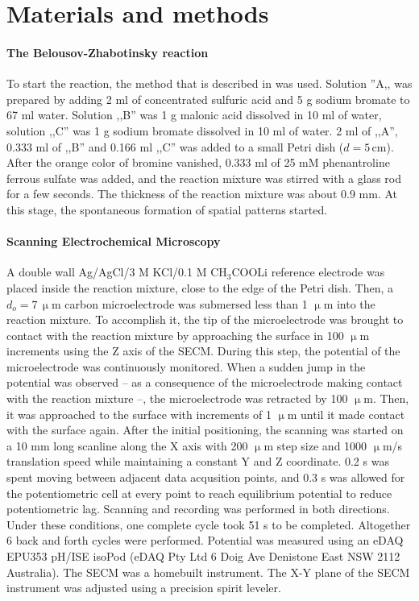\documentclass[3p, twocolumn]{elsarticle}
\begin{document}
\section{Materials and methods}
\paragraph{The Belousov-Zhabotinsky reaction} 
To start the reaction, the method that is described in \cite{winfree} was used.
Solution ''A,, was prepared by adding 2 ml of concentrated sulfuric acid and 5 g sodium bromate to 67 ml water.
Solution ,,B'' was 1 g malonic acid dissolved in 10 ml of water, solution ,,C'' was 1 g sodium bromate dissolved in 10 ml of water.
2 ml of ,,A'', 0.333 ml of ,,B'' and 0.166 ml ,,C'' was added to a small Petri dish ($d = 5 \,$cm).
After the orange color of bromine vanished, 0.333 ml of 25 mM phenantroline ferrous sulfate was added, and the reaction mixture was stirred with a glass rod for a few seconds.
The thickness of the reaction mixture was about 0.9 mm.
At this stage, the spontaneous formation of spatial patterns started.

\paragraph{Scanning Electrochemical Microscopy} A double wall Ag/AgCl/3 M KCl/0.1 M CH$_3$COOLi reference electrode was placed inside the reaction mixture, close to the edge of the Petri dish.
Then, a $d_o = 7\, \upmu$m carbon microelectrode was submersed less than 1 $\upmu$m into the reaction mixture.
To accomplish it, the tip of the microelectrode was brought to contact with the reaction mixture by approaching the surface in 100 $\upmu$m increments using the Z axis of the SECM.
During this step, the potential of the microelectrode was continuously monitored.
When a sudden jump in the potential was observed -- as a consequence of the microelectrode making contact with the reaction mixture --, the microelectrode was retracted by 100 $\upmu$m.
Then, it was approached to the surface with increments of 1 $\upmu$m until it made contact with the surface again.
After the initial positioning, the scanning was started on a 10 mm long scanline along the X axis with 200 $\upmu$m step size and 1000 $\upmu$m/s translation speed while maintaining a constant Y and Z coordinate.
0.2 s was spent moving between adjacent data acqusition points, and 0.3 s was allowed for the potentiometric cell at every point to reach equilibrium potential to reduce potentiometric lag.
Scanning and recording was performed in both directions.
Under these conditions, one complete cycle took 51 s to be completed.
Altogether 6 back and forth cycles were performed.
Potential was measured using an eDAQ EPU353 pH/ISE isoPod (eDAQ Pty Ltd 6 Doig Ave Denistone East NSW 2112 Australia).
The SECM was a homebuilt instrument.
The X-Y plane of the SECM instrument was adjusted using a precision spirit leveler.
\end{document}
